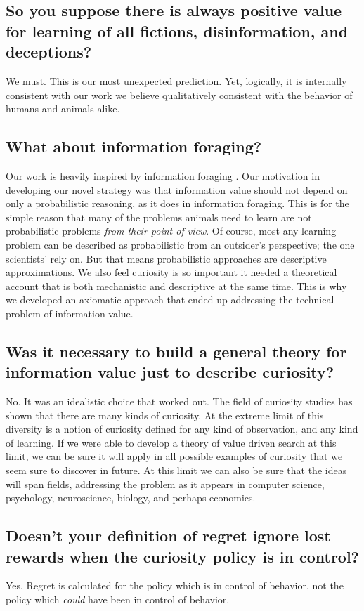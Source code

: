 \subsection*{So you suppose there is always positive value for learning of all fictions, disinformation, and deceptions?}
We must. This is our most unexpected prediction. Yet, logically, it is internally consistent with our work we believe qualitatively consistent with the behavior of humans and animals alike.

\subsection*{What about information foraging?}
Our work is heavily inspired by information foraging \citep{Inglis2001,Reddy2016}. Our motivation in developing our novel strategy was that information value should not depend on only a probabilistic reasoning, as it does in information foraging. This is for the simple reason that many of the problems animals need to learn are not probabilistic problems \textit{from their point of view}. Of course, most any learning problem can be described as probabilistic from an outsider's perspective; the one scientists' rely on. But that means probabilistic approaches are descriptive approximations. We also feel curiosity is so important it needed a theoretical account that is both mechanistic and descriptive at the same time. This is why we developed an axiomatic approach that ended up addressing the technical problem of information value.


\subsection*{Was it necessary to build a general theory for information value just to describe curiosity?}
No. It was an idealistic choice that worked out. The field of curiosity studies has shown that there are many kinds of curiosity. At the extreme limit of this diversity is a notion of curiosity defined for any kind of observation, and any kind of learning. If we were able to develop a theory of value driven search at this limit, we can be sure it will apply in all possible examples of curiosity that we seem sure to discover in future. At this limit we can also be sure that the ideas will span fields, addressing the problem as it appears in computer science, psychology, neuroscience, biology, and perhaps economics.


\subsection{Doesn't your definition of regret ignore lost rewards when the curiosity policy is in control?}
Yes. Regret is calculated for the policy which is in control of behavior, not the policy which \textit{could} have been in control of behavior.


